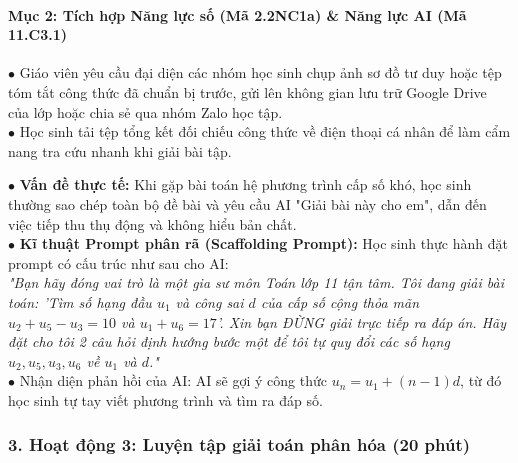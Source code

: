 \documentclass[12pt, a4paper]{article}
\begin{document}
\paragraph{Mục 2: Tích hợp Năng lực số (Mã 2.2NC1a) \& Năng lực AI (Mã 11.C3.1)}

\begin{pedabox}
    $\bullet$ Giáo viên yêu cầu đại diện các nhóm học sinh chụp ảnh sơ đồ tư duy hoặc tệp tóm tắt công thức đã chuẩn bị trước, gửi lên không gian lưu trữ Google Drive của lớp hoặc chia sẻ qua nhóm Zalo học tập.\\
    $\bullet$ Học sinh tải tệp tổng kết đối chiếu công thức về điện thoại cá nhân để làm cẩm nang tra cứu nhanh khi giải bài tập.
\end{pedabox}

\begin{aibox}
    $\bullet$ \textbf{Vấn đề thực tế:} Khi gặp bài toán hệ phương trình cấp số khó, học sinh thường sao chép toàn bộ đề bài và yêu cầu AI "Giải bài này cho em", dẫn đến việc tiếp thu thụ động và không hiểu bản chất.\\
    $\bullet$ \textbf{Kĩ thuật Prompt phân rã (Scaffolding Prompt):} Học sinh thực hành đặt prompt có cấu trúc như sau cho AI:\\
    \textit{"Bạn hãy đóng vai trò là một gia sư môn Toán lớp 11 tận tâm. Tôi đang giải bài toán: 'Tìm số hạng đầu $u_1$ và công sai $d$ của cấp số cộng thỏa mãn $u_2 + u_5 - u_3 = 10$ và $u_1 + u_6 = 17$'. Xin bạn ĐỪNG giải trực tiếp ra đáp án. Hãy đặt cho tôi 2 câu hỏi định hướng bước một để tôi tự quy đổi các số hạng $u_2, u_5, u_3, u_6$ về $u_1$ và $d$."}\\
    $\bullet$ Nhận diện phản hồi của AI: AI sẽ gợi ý công thức $u_n = u_1 + (n - 1)d$, từ đó học sinh tự tay viết phương trình và tìm ra đáp số.
\end{aibox}

\subsubsection*{3. Hoạt động 3: Luyện tập giải toán phân hóa (20 phút)}
\end{document}
